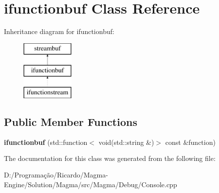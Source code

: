 \hypertarget{classifunctionbuf}{}\section{ifunctionbuf Class Reference}
\label{classifunctionbuf}
Inheritance diagram for ifunctionbuf\+:\begin{figure}[H]
\begin{center}
\leavevmode
\includegraphics[height=3.000000cm]{classifunctionbuf}
\end{center}
\end{figure}
\subsection*{Public Member Functions}
\begin{DoxyCompactItemize}
\item 
\mbox{\label{classifunctionbuf_a6e068a70a5044221e7b3f53b969e02a5}} 
{\bfseries ifunctionbuf} (std\+::function$<$ void(std\+::string \&)$>$ const \&function)
\end{DoxyCompactItemize}


The documentation for this class was generated from the following file\+:\begin{DoxyCompactItemize}
\item 
D\+:/\+Programação/\+Ricardo/\+Magma-\/\+Engine/\+Solution/\+Magma/src/\+Magma/\+Debug/Console.\+cpp\end{DoxyCompactItemize}
